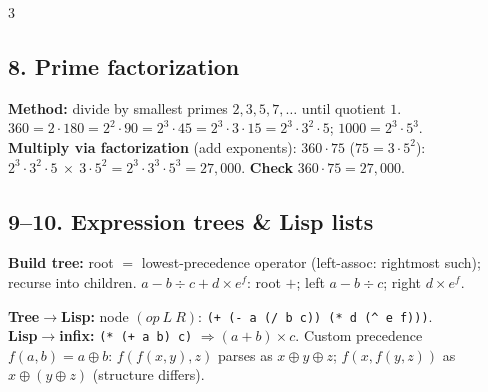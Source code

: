 \documentclass[9pt]{extarticle}
\newcommand{\hl}[1]{\textbf{\textcolor{BrickRed}{#1}}}
\begin{document}
\begin{multicols}{3}
\subsection{8. Prime factorization}
\begin{sloppypar}\raggedright
\textbf{Method:} divide by smallest primes $2,3,5,7,\ldots$ until quotient $1$.\\
$360{=}2{\cdot}180{=}2^2{\cdot}90{=}2^3{\cdot}45{=}2^3{\cdot}3{\cdot}15{=}2^3{\cdot}3^2{\cdot}5$; \quad $1000{=}2^3{\cdot}5^3$.\\
\textbf{Multiply via factorization} (add exponents): $360{\cdot}75$ ($75{=}3{\cdot}5^2$): $2^3{\cdot}3^2{\cdot}5\ {\times}\ 3{\cdot}5^2{=}2^3{\cdot}3^3{\cdot}5^3{=}27{,}000$. \hl{Check} $360{\cdot}75{=}27{,}000$.
\end{sloppypar}

\subsection{9--10. Expression trees \& Lisp lists}
\begin{sloppypar}\raggedright
\textbf{Build tree:} root $=$ lowest-precedence operator (left-assoc: rightmost such); recurse into children. $a-b\div c+d{\times}e^f$: root $+$; left $a-b\div c$; right $d{\times}e^f$.
\end{sloppypar}
\begin{center}
\end{center}
\begin{sloppypar}\raggedright
\textbf{Tree$\to$Lisp:} node $(op\ L\ R)$: \texttt{(+ (- a (/ b c)) (* d (\textasciicircum{} e f)))}.\\
\textbf{Lisp$\to$infix:} \texttt{(* (+ a b) c)} $\Rightarrow(a{+}b){\times}c$. Custom precedence $f(a,b){=}a\oplus b$: $f(f(x,y),z)$ parses as $x\oplus y\oplus z$; $f(x,f(y,z))$ as $x\oplus(y\oplus z)$ (structure differs).
\end{sloppypar}


\end{multicols}
\end{document}
